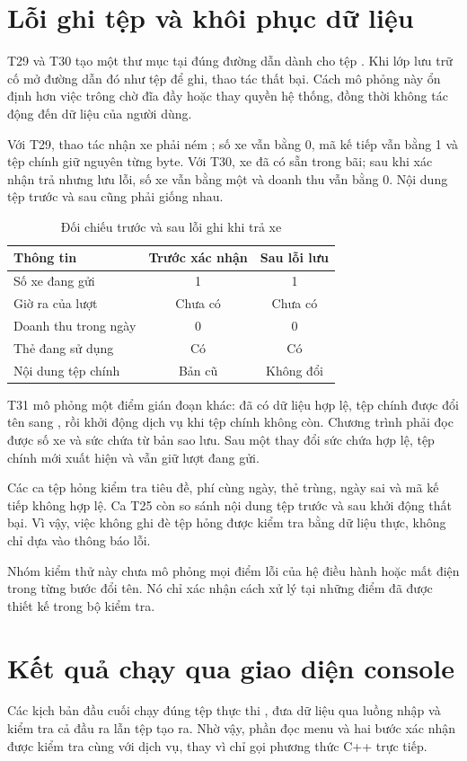 \section{Lỗi ghi tệp và khôi phục dữ liệu}
T29 và T30 tạo một thư mục tại đúng đường dẫn dành cho tệp . Khi lớp lưu trữ cố mở đường dẫn đó như tệp để ghi, thao tác thất bại. Cách mô phỏng này ổn định hơn việc trông chờ đĩa đầy hoặc thay quyền hệ thống, đồng thời không tác động đến dữ liệu của người dùng.

Với T29, thao tác nhận xe phải ném ; số xe vẫn bằng 0, mã kế tiếp vẫn bằng 1 và tệp chính giữ nguyên từng byte. Với T30, xe đã có sẵn trong bãi; sau khi xác nhận trả nhưng lưu lỗi, số xe vẫn bằng một và doanh thu vẫn bằng 0. Nội dung tệp trước và sau cũng phải giống nhau.

\begin{table}[H]
\centering\small
\caption{Đối chiếu trước và sau lỗi ghi khi trả xe}
\label{tab:save-failure}
\begin{tabularx}{\textwidth}{Y c c}
\toprule
Thông tin & Trước xác nhận & Sau lỗi lưu\\
\midrule
Số xe đang gửi & 1 & 1\\
Giờ ra của lượt & Chưa có & Chưa có\\
Doanh thu trong ngày & 0 & 0\\
Thẻ đang sử dụng & Có & Có\\
Nội dung tệp chính & Bản cũ & Không đổi\\
\bottomrule
\end{tabularx}
\end{table}

T31 mô phỏng một điểm gián đoạn khác: đã có dữ liệu hợp lệ, tệp chính được đổi tên sang , rồi khởi động dịch vụ khi tệp chính không còn. Chương trình phải đọc được số xe và sức chứa từ bản sao lưu. Sau một thay đổi sức chứa hợp lệ, tệp chính mới xuất hiện và vẫn giữ lượt đang gửi.

Các ca tệp hỏng kiểm tra tiêu đề, phí cùng ngày, thẻ trùng, ngày sai và mã kế tiếp không hợp lệ. Ca T25 còn so sánh nội dung tệp trước và sau khởi động thất bại. Vì vậy, việc không ghi đè tệp hỏng được kiểm tra bằng dữ liệu thực, không chỉ dựa vào thông báo lỗi.

Nhóm kiểm thử này chưa mô phỏng mọi điểm lỗi của hệ điều hành hoặc mất điện trong từng bước đổi tên. Nó chỉ xác nhận cách xử lý tại những điểm đã được thiết kế trong bộ kiểm tra.

\section{Kết quả chạy qua giao diện console}
Các kịch bản đầu cuối chạy đúng tệp thực thi , đưa dữ liệu qua luồng nhập và kiểm tra cả đầu ra lẫn tệp tạo ra. Nhờ vậy, phần đọc menu và hai bước xác nhận được kiểm tra cùng với dịch vụ, thay vì chỉ gọi phương thức C++ trực tiếp.

